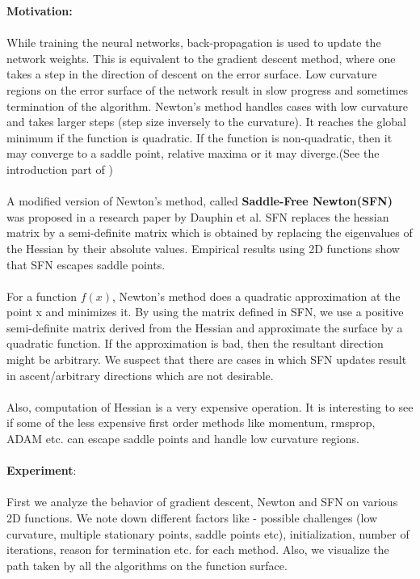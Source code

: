 \textbf{Motivation:}
\\\\
While training the neural networks, back-propagation is used to update the network weights. This is equivalent to the gradient descent method, where one takes a step in the direction of descent on the error surface. Low curvature regions on the error surface of the network result in slow progress and sometimes termination of the algorithm. Newton’s method handles cases with low curvature and takes larger steps (step size inversely to
the curvature). It reaches the global minimum if the function is quadratic. If the function is non-quadratic, then it may converge to a saddle point, relative maxima or it may diverge.(See the introduction part of \cite{oke})
\\\\
A modified version of Newton’s method, called \textbf{Saddle-Free Newton(SFN)} was proposed in a research paper by Dauphin et al.\cite{dauphin} SFN replaces the hessian matrix by a semi-definite matrix which is obtained by replacing the eigenvalues of the Hessian by their absolute values. Empirical results using 2D functions show that SFN escapes saddle points.
\\\\
For a function $f(x)$, Newton’s method does a quadratic approximation at the point x and minimizes it. By using the matrix defined in SFN, we use a positive semi-definite matrix derived from the Hessian and approximate the surface by a quadratic function. If the approximation is bad, then the resultant direction might be arbitrary. We suspect that there are cases in which SFN updates result in ascent/arbitrary directions which are not desirable.
\\\\
Also, computation of Hessian is a very expensive operation. It is interesting to see if some of the less expensive first order methods like momentum, rmsprop, ADAM etc. can escape saddle points and handle low curvature regions.
\\\\
\textbf{Experiment}:
\\\\First we analyze the behavior of gradient descent, Newton and SFN on various 2D functions. We note down different factors like - possible challenges (low curvature, multiple stationary points, saddle points etc), initialization, number of iterations, reason for termination etc. for each method. Also, we visualize the path taken by all the algorithms on the function surface.

